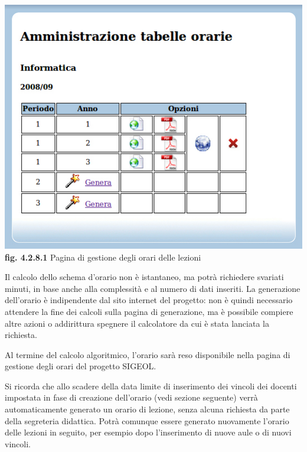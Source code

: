 \documentclass[11pt,a4paper]{article}
\begin{document}
\bigskip
\begin{center}
	\includegraphics[scale=0.5]{images/amministrazione_orario.jpg}\\
	\textbf{fig. 4.2.8.1} Pagina di gestione degli orari delle lezioni\\
\end{center}
\bigskip

Il calcolo dello schema d'orario non è istantaneo, ma potrà richiedere svariati minuti, in base anche alla complessità e al numero di dati inseriti.
La generazione dell'orario è indipendente dal sito internet del progetto: non è quindi necessario attendere la fine dei calcoli sulla pagina di generazione, ma è possibile compiere altre azioni o addirittura spegnere il calcolatore da cui è stata lanciata la richiesta.

Al termine del calcolo algoritmico, l'orario sarà reso disponibile nella pagina di gestione degli orari del progetto SIGEOL.

Si ricorda che allo scadere della data limite di inserimento dei vincoli dei docenti impostata in fase di creazione dell'orario (vedi sezione seguente) verrà automaticamente generato un orario di lezione, senza alcuna richiesta da parte della segreteria didattica. Potrà comunque essere generato nuovamente l'orario delle lezioni in seguito, per esempio dopo l'inserimento di nuove aule o di nuovi vincoli.
\end{document}

